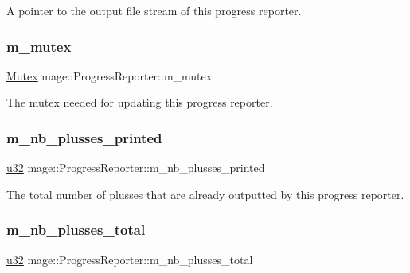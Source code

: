A pointer to the output file stream of this progress reporter. \hypertarget{classmage_1_1_progress_reporter_a32a499aa1b8fccbc8393fe32305dfeb1}{}\label{classmage_1_1_progress_reporter_a32a499aa1b8fccbc8393fe32305dfeb1} 
\subsubsection{\texorpdfstring{m\+\_\+mutex}{m\_mutex}}
{\footnotesize\ttfamily \hyperlink{structmage_1_1_mutex}{Mutex} mage\+::\+Progress\+Reporter\+::m\+\_\+mutex\hspace{0.3cm}{\ttfamily [private]}}

The mutex needed for updating this progress reporter. \hypertarget{classmage_1_1_progress_reporter_ab76274a96e0a753877da8d63b9cf797d}{}\label{classmage_1_1_progress_reporter_ab76274a96e0a753877da8d63b9cf797d} 
\subsubsection{\texorpdfstring{m\+\_\+nb\+\_\+plusses\+\_\+printed}{m\_nb\_plusses\_printed}}
{\footnotesize\ttfamily \hyperlink{namespacemage_af2b398bf98eb10351f49cad73fe2cc73}{u32} mage\+::\+Progress\+Reporter\+::m\+\_\+nb\+\_\+plusses\+\_\+printed\hspace{0.3cm}{\ttfamily [private]}}

The total number of plusses that are already outputted by this progress reporter. \hypertarget{classmage_1_1_progress_reporter_a541874e40cf7f9f2ff6b84c7c11d48cb}{}\label{classmage_1_1_progress_reporter_a541874e40cf7f9f2ff6b84c7c11d48cb} 
\subsubsection{\texorpdfstring{m\+\_\+nb\+\_\+plusses\+\_\+total}{m\_nb\_plusses\_total}}
{\footnotesize\ttfamily \hyperlink{namespacemage_af2b398bf98eb10351f49cad73fe2cc73}{u32} mage\+::\+Progress\+Reporter\+::m\+\_\+nb\+\_\+plusses\+\_\+total\hspace{0.3cm}{\ttfamily [private]}}

